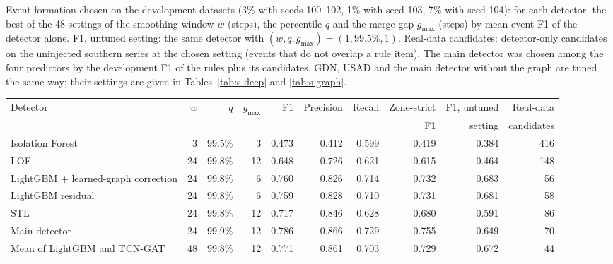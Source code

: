 \documentclass[11pt,a4paper]{article}
\makeatletter
\newenvironment{stable}{\par\addvspace{8pt}\noindent\begin{minipage}{\textwidth}\def\@captype{table}\centering}{\end{minipage}\par\addvspace{8pt}}
\makeatother
\begin{document}
\begin{stable}
\caption{Event formation chosen on the development datasets (3\% with seeds 100--102, 1\% with seed 103, 7\% with seed 104): for each detector, the best of the 48 settings of the smoothing window $w$ (steps), the percentile $q$ and the merge gap $g_{\max}$ (steps) by mean event F1 of the detector alone. F1, untuned setting: the same detector with $(w, q, g_{\max}) = (1, 99.5\%, 1)$. Real-data candidates: detector-only candidates on the uninjected southern series at the chosen setting (events that do not overlap a rule item). The main detector was chosen among the four predictors by the development F1 of the rules plus its candidates. GDN, USAD and the main detector without the graph are tuned the same way; their settings are given in Tables~\ref{tab:s-deep} and \ref{tab:s-graph}.}\label{tab:s-dev}
\scriptsize\setlength{\tabcolsep}{3.5pt}
\begin{tabular}{@{}l r r r r r r r r r@{}}
\toprule
Detector & $w$ & $q$ & $g_{\max}$ & F1 & Precision & Recall & Zone-strict & F1, untuned & Real-data \\
 & & & & & & & F1 & setting & candidates \\
\midrule
Isolation Forest & 3 & 99.5\% & 3 & 0.473 & 0.412 & 0.599 & 0.419 & 0.384 & 416 \\
LOF & 24 & 99.8\% & 12 & 0.648 & 0.726 & 0.621 & 0.615 & 0.464 & 148 \\
LightGBM + learned-graph correction & 24 & 99.8\% & 6 & 0.760 & 0.826 & 0.714 & 0.732 & 0.683 & 56 \\
LightGBM residual & 24 & 99.8\% & 6 & 0.759 & 0.828 & 0.710 & 0.731 & 0.681 & 58 \\
STL & 24 & 99.8\% & 12 & 0.717 & 0.846 & 0.628 & 0.680 & 0.591 & 86 \\
Main detector & 24 & 99.9\% & 12 & 0.786 & 0.866 & 0.729 & 0.755 & 0.649 & 70 \\
Mean of LightGBM and TCN-GAT & 48 & 99.8\% & 12 & 0.771 & 0.861 & 0.703 & 0.729 & 0.672 & 44 \\
\bottomrule
\end{tabular}
\end{stable}
\end{document}
